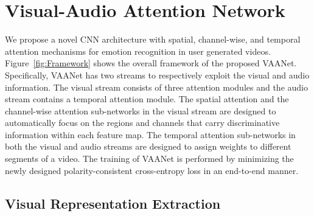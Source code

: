 \documentclass[letterpaper]{article} \usepackage{aaai20}  \usepackage{times}  \usepackage{helvet} \usepackage{courier}  \usepackage[hyphens]{url}  \usepackage{graphicx} \urlstyle{rm} \def\UrlFont{\rm}  \usepackage{graphicx}
\begin{document}
\section{Visual-Audio Attention Network}
\label{sec:VAANet}
We propose a novel CNN architecture with spatial, channel-wise, and temporal attention mechanisms for emotion recognition in user generated videos. Figure~\ref{fig:Framework} shows the overall framework of the proposed VAANet. Specifically, VAANet has two streams to respectively exploit the visual and audio information. The visual stream consists of three attention modules and the audio stream contains a temporal attention module. The spatial attention and the channel-wise attention sub-networks in the visual stream are designed to automatically focus on the regions and channels that carry discriminative information within each feature map. The temporal attention sub-networks in both the visual and audio streams are designed to assign weights to different segments of a video. The training of VAANet is performed by minimizing the newly designed polarity-consistent cross-entropy loss in an end-to-end manner.

\subsection{Visual Representation Extraction}
\label{ssec:Representation}
\end{document}
